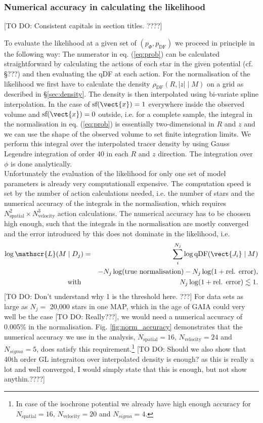 \subsubsection{Numerical accuracy in calculating the likelihood} \label{sec:numaccuracynormalisation}
[TO DO: Consistent capitals in section titles. ????]

To evaluate the likelihood at a given set of $(p_\Phi,p_\text{DF})$ we proceed in principle in the following way: The numerator in eq. (\ref{eq:prob}) can be calculated straightforward by calculating the actions of each star in the given potential (cf. \S ???) and then evaluating the qDF at each action. For the normalisation of the likelihood we first have to calculate the density $\rho_\text{DF}(R,|z| \mid M)$ on a grid as described in \S\ref{sec:density}. The density is then interpolated using bi-variate spline interpolation. In the case of $\text{sf}(\vect{x})=1$ everywhere inside the observed volume and $\text{sf}(\vect{x})=0$ outside, i.e. for a complete sample, the integral in the normalisation in eq. (\ref{eq:prob}) is essentially two-dimensional in $R$ and $z$ and we can use the shape of the observed volume to set finite integration limits. We perform this integral over the interpolated tracer density by using Gauss Legendre integration of order 40 in each $R$ and $z$ direction. The integration over $\phi$ is done analytically.
\\Unfortunately the evaluation of the likelihood for only one set of model parameters is already very computationall expensive. The computation speed is set by the number of action calculations needed, i.e. the number of stars and the numerical accuracy of the integrals in the normalisation, which requires $N_\text{spatial}^2 \times N_\text{velocity}^3$ action calculations. The numerical accuracy has to be choosen high enough, such that the integrals in the normalisation are mostly converged and the error introduced by this does not dominate in the likelihood, i.e.
\begin{eqnarray}
\log \mathscr{L}(M \mid D_j) &=& \sum_i^{N_j} \log \text{qDF}(\vect{J_i} \mid M) \nonumber\\
& & -N_j \log(\text{true normalisation}) - N_j \log (1 + \text{rel. error}),\label{eq:relerrlikelihood}\\
 \text{with }  & &N_j \log (1 + \text{rel. error}) \lesssim 1.\nonumber
\end{eqnarray}
[TO DO: Don't understand why 1 is the threshold here. ???]
For data sets as large as $N_j =$ 20,000 stars in one MAP, which in the age of GAIA could very well be the case [TO DO: Really???], we would need a numerical accuracy of 0.005\% in the normalisation. Fig. \ref{fig:norm_accuracy} demonstrates that the numerical accuracy we use in the analysis, $N_\text{spatial}=16$, $N_\text{velocity}=24$ and $N_{sigma}=5$, does satisfy this requirement.\footnote{In case of the isochrone potential we already have high enough accuracy for $N_\text{spatial}=16$, $N_\text{velocity}=20$ and $N_{sigma}=4$.} [TO DO: Should we also show that 40th order GL integraiton over interpolated density is enough? as this is really a lot and well converged, I would simply state that this is enough, but not show anythin.????]
